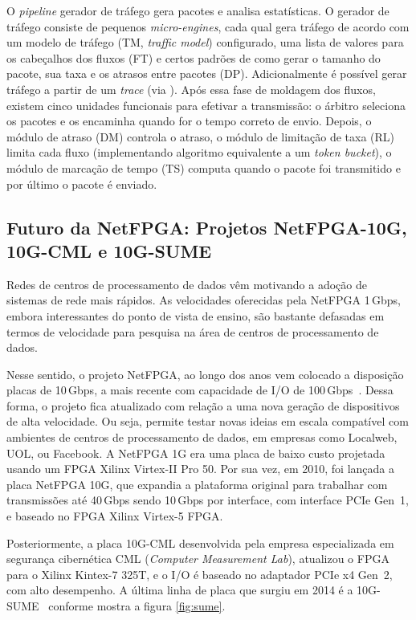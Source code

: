 O \textit{pipeline} gerador de tráfego gera pacotes e analisa
estatísticas. O gerador de tráfego consiste de pequenos
\textit{micro-engines}, cada qual gera tráfego de acordo com um
modelo de tráfego (TM, \emph{traffic model}) configurado, uma lista
de valores para os cabeçalhos dos fluxos (FT) e certos padrões de
como gerar o tamanho do pacote, sua taxa e os atrasos entre pacotes
(DP).  Adicionalmente é possível gerar tráfego a partir de um
\textit{trace}  (via ). Após essa fase de
moldagem dos fluxos, existem cinco unidades funcionais para efetivar
a transmissão: o árbitro seleciona os pacotes e os encaminha quando
for o tempo correto de envio.  Depois, o módulo de atraso (DM)
controla o atraso, o módulo de limitação de taxa (RL) limita cada
fluxo (implementando algoritmo equivalente a um \emph{token
bucket}), o módulo de marcação de tempo (TS) computa quando o pacote
foi transmitido e por último o pacote é enviado.

\subsection{Futuro da NetFPGA: Projetos NetFPGA-10G, 10G-CML e 10G-SUME}

Redes de centros de processamento de dados vêm motivando a adoção de
sistemas de rede mais rápidos. As velocidades oferecidas pela
NetFPGA 1\,Gbps, embora interessantes do ponto de vista de ensino,
são bastante defasadas em termos de velocidade para pesquisa na área
de centros de processamento de dados.

Nesse sentido, o projeto NetFPGA, ao longo dos anos vem colocado a
disposição placas de 10\,Gbps, a mais recente com capacidade de I/O
de 100\,Gbps~\cite{6866035}. Dessa forma, o projeto fica atualizado
com relação a uma nova geração de dispositivos de alta velocidade.
Ou seja, permite testar novas ideias em escala compatível com
ambientes de centros de processamento de dados, em empresas como
Localweb, UOL, ou Facebook. A NetFPGA 1G era uma placa de baixo
custo projetada usando um FPGA Xilinx Virtex-II Pro 50. Por sua vez,
em 2010, foi lançada a placa NetFPGA 10G, que expandia a plataforma
original para trabalhar com transmissões até 40\,Gbps sendo 10\,Gbps
por interface, com interface PCIe Gen~1, e baseado no FPGA Xilinx
Virtex-5 FPGA.

Posteriormente, a placa 10G-CML desenvolvida pela empresa
especializada em segurança cibernética CML (\textit{Computer
Measurement Lab}), atualizou o FPGA para o Xilinx Kintex-7 325T, e o
I/O é baseado no adaptador PCIe x4 Gen~2, com alto desempenho. A
última linha de placa que surgiu em 2014 é a 10G-SUME~\cite{6866035}
conforme mostra a figura \ref{fig:sume}.

